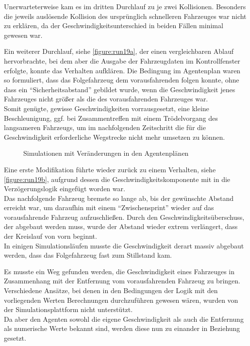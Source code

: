 Unerwarteterweise kam es im dritten Durchlauf zu je zwei Kollisionen.
Besonders die jeweils auslösende Kollision des ursprünglich schnelleren Fahrzeuges war nicht zu erklären, da der Geschwindigkeitsunterschied in beiden Fällen minimal gewesen war.

Ein weiterer Durchlauf, siehe \cref{figure:run19a}, der einen vergleichbaren Ablauf hervorbrachte, bei dem aber die Ausgabe der Fahrzeugdaten im Kontrollfenster erfolgte, konnte das Verhalten aufklären.
Die Bedingung im Agentenplan waren so formuliert, dass das Folgefahrzeug dem vorausfahrenden folgen konnte, ohne dass ein \enquote{Sicherheitsabstand} gebildet wurde, wenn die Geschwindigkeit jenes Fahrzeuges nicht größer als die des vorausfahrenden Fahrzeuges war. 
\\
Somit genügte, gewisse Geschwindigkeiten vorrausgesetzt, eine kleine Beschleunigung, ggf. bei Zusammentreffen mit einem Trödelvorgang des langsameren Fahrzeugs, um im nachfolgenden Zeitschritt die für die Geschwindigkeit erforderliche Wegstrecke nicht mehr umsetzen zu können.

\begin{figure}[hptb]
  \centering 
   \qquad 
   \qquad 
  \caption{Simulationen mit Veränderungen in den Agentenplänen} 
  \label{figure:run19a-c}
\end{figure}

Eine erste Modifikation führte wieder zurück zu einem Verhalten, siehe \cref{figure:run19b}, aufgrund dessen die Geschwindigkeitskomponente mit in die Verzögerungslogik eingefügt worden war. 
\\
Das nachfolgende Fahrzeug bremste so lange ab, bis der gewünschte Abstand erreicht war, um daraufhin mit einem \enquote{Zwischensprint} wieder auf das vorausfahrende Fahrzeug aufzuschließen.
Durch den Geschwindigkeitsüberschuss, der abgebaut werden muss, wurde der Abstand wieder extrem verlängert, dass der Kreislauf von vorn beginnt.
\\
In einigen Simulationsläufen musste die Geschwindigkeit derart massiv abgebaut werden, dass das Folgefahrzeug fast zum Stillstand kam.

Es musste ein Weg gefunden werden, die Geschwindigkeit eines Fahrzeuges in Zusammenhang mit der Entfernung vom vorausfahrenden Fahrzeug zu bringen.
\\
Verschiedene Ansätze, bei denen in den Bedingungen der Logik mit den vorliegenden Werten Berechnungen durchzuführen gewesen wären, wurden von der Simulationsplattform nicht unterstützt.
\\
Da aber den Agenten sowohl die eigene Geschwindigkeit als auch die Entfernung als numerische Werte bekannt sind, werden diese nun zu einander in Beziehung gesetzt.


